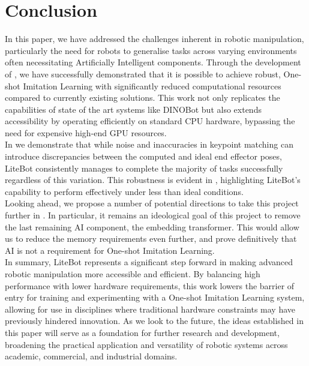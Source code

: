 \chapter{Conclusion}
\label{chap:conclusion}

In this paper, we have addressed the challenges inherent in robotic manipulation, particularly the need for robots to generalise tasks across varying environments often necessitating Artificially Intelligent components. Through the development of , we have successfully demonstrated that it is possible to achieve robust, One-shot Imitation Learning with significantly reduced computational resources compared to currently existing solutions. This work not only replicates the capabilities of state of the art systems like DINOBot \cite{one-shot-imitation} but also extends accessibility by operating efficiently on standard CPU hardware, bypassing the need for expensive high-end GPU resources.\\

In  we demonstrate that while noise and inaccuracies in keypoint matching can introduce discrepancies between the computed and ideal end effector poses, LiteBot consistently manages to complete the majority of tasks successfully regardless of this variation. This robustness is evident in , highlighting LiteBot's capability to perform effectively under less than ideal conditions.\\

Looking ahead, we propose a number of potential directions to take this project further in . In particular, it remains an ideological goal of this project to remove the last remaining AI component, the embedding transformer. This would allow us to reduce the memory requirements even further, and prove definitively that AI is not a requirement for One-shot Imitation Learning.\\

In summary, LiteBot represents a significant step forward in making advanced robotic manipulation more accessible and efficient. By balancing high performance with lower hardware requirements, this work lowers the barrier of entry for training and experimenting with a One-shot Imitation Learning system, allowing for use in disciplines where traditional hardware constraints may have previously hindered innovation. As we look to the future, the ideas established in this paper will serve as a foundation for further research and development, broadening the practical application and versatility of robotic systems across academic, commercial, and industrial domains.